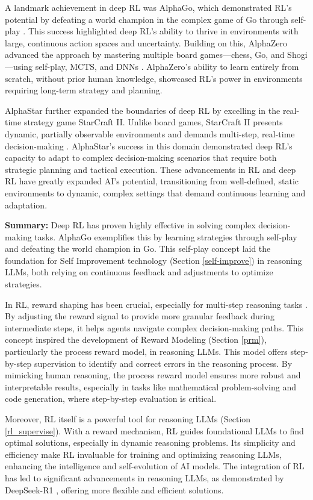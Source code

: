 A landmark achievement in deep RL was AlphaGo, which demonstrated RL's potential by defeating a world champion in the complex game of Go through self-play \cite{silver2016mastering}. 
This success highlighted deep RL's ability to thrive in environments with large, continuous action spaces and uncertainty. 
Building on this, AlphaZero advanced the approach by mastering multiple board games—chess, Go, and Shogi—using self-play, MCTS, and DNNs \cite{silver2017mastering}. 
AlphaZero's ability to learn entirely from scratch, without prior human knowledge, showcased RL's power in environments requiring long-term strategy and planning.

AlphaStar further expanded the boundaries of deep RL by excelling in the real-time strategy game StarCraft II. 
Unlike board games, StarCraft II presents dynamic, partially observable environments and demands multi-step, real-time decision-making \cite{vinyals2019grandmaster}. 
AlphaStar's success in this domain demonstrated deep RL's capacity to adapt to complex decision-making scenarios that require both strategic planning and tactical execution. 
These advancements in RL and deep RL have greatly expanded AI's potential, transitioning from well-defined, static environments to dynamic, complex settings that demand continuous learning and adaptation.


\noindent\textbf{Summary:} 
Deep RL has proven highly effective in solving complex decision-making tasks. AlphaGo exemplifies this by learning strategies through self-play and defeating the world champion in Go. 
This self-play concept laid the foundation for Self Improvement technology (Section \ref{self-improve}) in reasoning LLMs, both relying on continuous feedback and adjustments to optimize strategies.

In RL, reward shaping has been crucial, especially for multi-step reasoning tasks \cite{ng1999policy}. 
By adjusting the reward signal to provide more granular feedback during intermediate steps, it helps agents navigate complex decision-making paths. 
This concept inspired the development of Reward Modeling (Section \ref{prm}), particularly the process reward model, in reasoning LLMs. 
This model offers step-by-step supervision to identify and correct errors in the reasoning process. 
By mimicking human reasoning, the process reward model ensures more robust and interpretable results, especially in tasks like mathematical problem-solving and code generation, where step-by-step evaluation is critical.

Moreover, RL itself is a powerful tool for reasoning LLMs (Section \ref{rl_supervise}). 
With a reward mechanism, RL guides foundational LLMs to find optimal solutions, especially in dynamic reasoning problems. 
Its simplicity and efficiency make RL invaluable for training and optimizing reasoning LLMs, enhancing the intelligence and self-evolution of AI models. 
The integration of RL has led to significant advancements in reasoning LLMs, as demonstrated by DeepSeek-R1 \cite{Deepseek-R1}, offering more flexible and efficient solutions.


